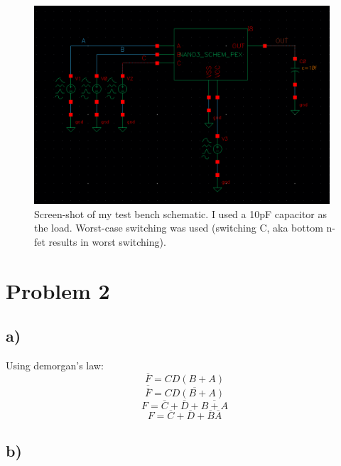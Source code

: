 \documentclass[11pt]{article}
\begin{document}
\begin{figure}[H]
  \includegraphics[width=0.98\textwidth]{schem.png}
  \caption{Screen-shot of my test bench schematic. I used a 10pF capacitor as the load. Worst-case switching was used (switching C, aka bottom n-fet results in worst switching).}
\end{figure}

\section{Problem 2}
\subsection{a)}
Using demorgan's law:
\[
\overline{F} = C D  (B + A)
\]
\[
\overline{\overline{F}} = \overline{C  D  (B + A)}
\]
\[
F = \overline{C} + \overline{D}  + \overline{B + A}
\]
\[
F = \overline{C} + \overline{D}  + \overline{B} \overline{A}
\]

\subsection{b)}
\end{document}
